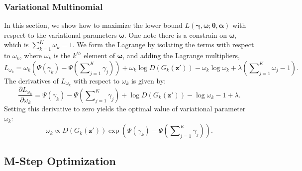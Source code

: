 \documentclass{article}
\begin{document}
\subsubsection{Variational Multinomial}
\label{App:VaMultinomial}

In this section, we show how to maximize the lower bound $L\left( \bm{\gamma},\bm{\omega}; \bm{\theta},\bm{\alpha} \right)$ with respect to the variational parameters $\bm{\omega}$.
One note there is a constrain on $\bm{\omega}$, which is $\sum_{k=1}^K\omega_k=1$.
We form the Lagrange by isolating the terms with respect to $\omega_k$, where $\omega_k$ is the $k^{th}$ element of $\bm{\omega}$, and adding the Lagrange multipliers,
\begin{equation}
\label{eq:Append.1.1-1}
L_{\omega_k}
=
\omega_k\left( \Psi \left( \gamma_k \right) - \Psi \left( \sum\nolimits_{j=1}^K \gamma_j \right) \right)
+ \omega_k \log D\left( G_k\left( \mathbf{z}' \right) \right)
- \omega_k \log \omega_k
+\lambda \left( \sum\nolimits_{j=1}^K \omega_j - 1\right).
\end{equation}
\noindent The derivatives of $L_{\omega_k}$ with respect to $\omega_k$ is given by:
\begin{equation}
\label{eq:Appendix13}
\frac{\partial L_{\omega_k}}{\partial \omega_k}
=
\Psi \left( \gamma_k \right) - \Psi \left( \sum\nolimits_{j=1}^K \gamma_j \right) + \log D\left( G_k\left( \mathbf{z}'\right) \right)
- \log \omega_k
- 1
+\lambda.
\end{equation}
Setting this derivative to zero yields the optimal value of variational parameter $\omega_k$:
\begin{equation}
\label{eq:Appendix14}
\omega_k
\propto
D\left( G_k\left( \mathbf{z}'\right) \right)\exp\left( \Psi\left(\gamma_k\right) - \Psi \left( \sum\nolimits_{j=1}^K \gamma_j\right) \right).
\end{equation}



\subsection{M-Step Optimization}
\label{App:PaEstimation}
\end{document}
